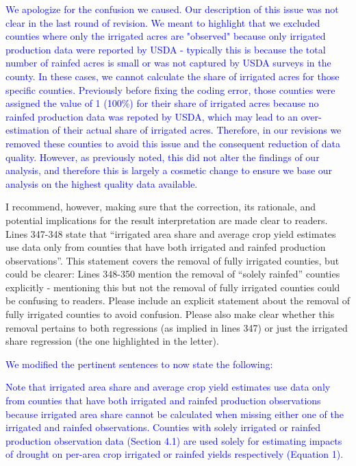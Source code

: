 \documentclass[
]{article}
\begin{document}
\textcolor{blue}{We apologize for the confusion we caused. Our description of this issue was not clear in the last round of revision. We meant to highlight that we excluded counties where only the irrigated acres are "observed" because only irrigated production data were reported by USDA - typically this is because the total number of rainfed acres is small or was not captured by USDA surveys in the county. In these cases, we cannot calculate the share of irrigated acres for those specific counties. Previously before fixing the coding error, those counties were assigned the value of 1 (100\%) for their share of irrigated acres because no rainfed production data was repoted by USDA, which may lead to an over-estimation of their actual share of irrigated acres. Therefore, in our revisions we removed these counties to avoid this issue and the consequent reduction of data quality. However, as previously noted, this did not alter the findings of our analysis, and therefore this is largely a cosmetic change to ensure we base our analysis on the highest quality data available.}

I recommend, however, making sure that the correction, its rationale,
and potential implications for the result interpretation are made clear
to readers. Lines 347-348 state that ``irrigated area share and average
crop yield estimates use data only from counties that have both
irrigated and rainfed production observations''. This statement covers
the removal of fully irrigated counties, but could be clearer: Lines
348-350 mention the removal of ``solely rainfed'' counties explicitly -
mentioning this but not the removal of fully irrigated counties could be
confusing to readers. Please include an explicit statement about the
removal of fully irrigated counties to avoid confusion. Please also make
clear whether this removal pertains to both regressions (as implied in
lines 347) or just the irrigated share regression (the one highlighted
in the letter).

\textcolor{blue}{We modified the pertinent sentences to now state the following:}

\textcolor{blue}{Note that irrigated area share and average crop yield estimates use data only from counties that have both irrigated and rainfed production observations because irrigated area share cannot be calculated when missing either one of the irrigated and rainfed observations. Counties with solely irrigated or rainfed production observation data (Section 4.1) are used solely for estimating impacts of drought on per-area crop irrigated or rainfed yields respectively (Equation 1).}
\end{document}
